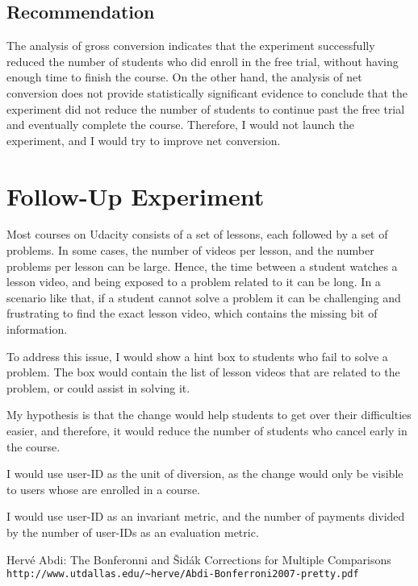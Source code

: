 \documentclass{article}
\begin{document}
\begin{multicols}{2}
\subsection{Recommendation}

The analysis of gross conversion indicates that the experiment successfully reduced the number of students who did enroll in the free trial, without having enough time to finish the course. On the other hand, the analysis of net conversion does not provide statistically significant evidence to conclude that the experiment did not reduce the number of students to continue past the free trial and eventually complete the course. Therefore, I would not launch the experiment, and I would try to improve net conversion.

\section{Follow-Up Experiment}

Most courses on Udacity consists of a set of lessons, each followed by a set of problems. In some cases, the number of videos per lesson, and the number problems per lesson can be large. Hence, the time between a student watches a lesson video, and being exposed to a problem related to it can be long. In a scenario like that, if a student cannot solve a problem it can be challenging and frustrating to find the exact lesson video, which contains the missing bit of information.

To address this issue, I would show a hint box to students who fail to solve a problem. The box would contain the list of lesson videos that are related to the problem, or could assist in solving it.

My hypothesis is that the change would help students to get over their difficulties easier, and therefore, it would reduce the number of students who cancel early in the course.

I would use user-ID as the unit of diversion, as the change would only be visible to users whose are enrolled in a course.

I would use user-ID as an invariant metric, and the number of payments divided by the number of user-IDs as an evaluation metric.

\end{multicols}

\begin{thebibliography}{1}

Hervé Abdi: The Bonferonni and Šidák Corrections for Multiple Comparisons
\\\texttt{http://www.utdallas.edu/\~{}herve/Abdi-Bonferroni2007-pretty.pdf}

\end{thebibliography}
\end{document}
